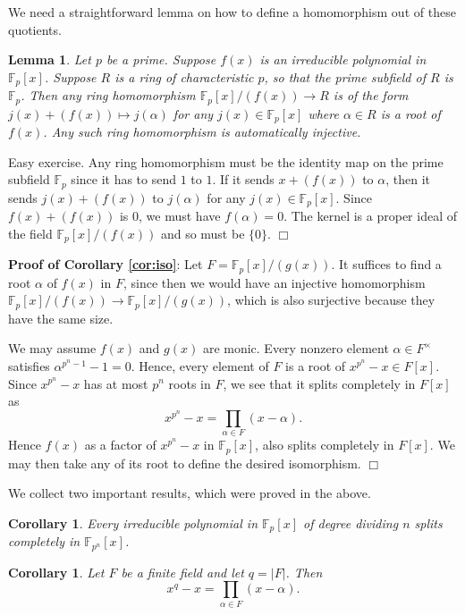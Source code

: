 \documentclass{article}
\def\F{{\mathbb F}}
\def\F{{\mathbb F}}
\def\v{{\vspace{5pt}}}
\newtheorem{cor}[subsection]{Corollary}
\newtheorem{lemma}[subsection]{Lemma}
\newenvironment{proof}{\noindent {\bf Proof:}}{$\Box$ \vspace{2 ex}}
\begin{document}
We need a straightforward lemma on how to define a homomorphism out of these quotients.
\begin{lemma}\label{lem:mapf}
    Let $p$ be a prime. Suppose $f(x)$ is an irreducible polynomial in $\F_p[x]$. Suppose $R$ is a ring of characteristic $p$, so that the prime subfield of $R$ is $\F_p$. Then any ring homomorphism $\F_p[x]/(f(x))\rightarrow R$ is of the form $j(x) + (f(x))\mapsto j(\alpha)$ for any $j(x)\in\F_p[x]$ where $\alpha\in R$ is a root of $f(x)$. Any such ring homomorphism is automatically injective.
\end{lemma}

\begin{proof}
    Easy exercise. Any ring homomorphism must be the identity map on the prime subfield $\F_p$ since it has to send $1$ to $1$. If it sends $x + (f(x))$ to $\alpha$, then it sends $j(x) + (f(x))$ to $j(\alpha)$ for any $j(x)\in\F_p[x]$. Since $f(x) + (f(x))$ is $0$, we must have $f(\alpha) = 0$. The kernel is a proper ideal of the field $\F_p[x]/(f(x))$ and so must be $\{0\}$.
\end{proof}

\noindent\textbf{Proof of Corollary \ref{cor:iso}}:
    Let $F = \F_p[x]/(g(x))$. It suffices to find a root $\alpha$ of $f(x)$ in $F$, since then we would have an injective homomorphism $\F_p[x]/(f(x))\rightarrow \F_p[x]/(g(x))$, which is also surjective because they have the same size. 

    We may assume $f(x)$ and $g(x)$ are monic. Every nonzero element $\alpha\in F^\times$ satisfies $\alpha^{p^n-1} - 1 =0$. Hence, every element of $F$ is a root of $x^{p^n}-x\in F[x]$. Since $x^{p^n}-x$ has at most $p^n$ roots in $F$, we see that it splits completely in $F[x]$ as $$x^{p^n} - x = \prod_{\alpha\in F}(x - \alpha).$$
    Hence $f(x)$ as a factor of $x^{p^n} - x$ in $\F_p[x]$, also splits completely in $F[x]$. We may then take any of its root to define the desired isomorphism. $\Box$

\v
We collect two important results, which were proved in the above.

\begin{cor}\label{cor:splits}
    Every irreducible polynomial in $\F_p[x]$ of degree dividing $n$ splits completely in $\F_{p^n}[x]$.
\end{cor}

\begin{cor}
    Let $F$ be a finite field and let $q = |F|$. Then $$x^{q} - x = \prod_{\alpha\in F}(x - \alpha).$$
\end{cor}
\end{document}
